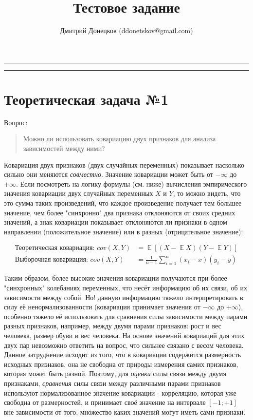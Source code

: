 \documentclass[a4paper,12pt]{article}
\title{\vspace{-1.5cm}Тестовое задание}
\author{Дмитрий Донецков (ddonetskov@gmail.com)}
\date{\vspace{-5ex}}            %
\DeclareMathOperator*{\E}{\mathbb{E}}   %
\begin{document}
\maketitle

\noindent\rule{\textwidth}{2pt}
\tableofcontents
\noindent\rule{\textwidth}{2pt}

\section{Теоретическая задача №1}

Вопрос:

\begin{quote}
Можно ли использовать ковариацию двух признаков для анализа зависимостей между ними?
\end{quote}

Ковариация двух признаков (двух случайных переменных) показывает насколько сильно они меняются \textit{совместно}. Значение ковариации может быть от $-\infty$ до $+\infty$. Если посмотреть на логику формулы (см. ниже) вычисления эмпирического значения ковариации двух случайных переменных $X$ и $Y$, то можно видеть, что это сумма таких произведений, что каждое произведение получает тем большее значение, чем более "синхронно" два признака отклоняются от своих средних значений, а знак ковариации показывает отклоняются ли признаки в одном направлении (положительное значение) или в разных (отрицательное значение):

\begin{align}
\text{Теоретическая ковариация:   } cov(X, Y) &= \E[(X-\E X)(Y-\E Y)] \\
\text{Выборочная ковариация:   } cov(X, Y) &= \frac{1}{n-1} \sum_{i=1}^{n} (x_i - \bar{x})(y_i - \bar{y})
\end{align}

Таким образом, более высокие значения ковариации получаются при более "синхронных" колебаниях переменных, что несёт информацию об их связи, об их зависимости между собой. Но! данную информацию тяжело интерпретировать в силу её ненормализованности (ковариация принимает значения от $-\infty$ до $+\infty$), особенно тяжело её использовать для сравнения силы зависимости между парами разных признаков, например, между двумя парами признаков: рост и вес человека, размер обуви и вес человека. На основе значений ковариаций для этих двух пар невозможно ответить на вопрос, что сильнее связано с весом человека. Данное затруднение исходит из того, что в ковариации содержится размерность исходных признаков, она не свободна от природы измерения самих признаков, которая может быть разной. Поэтому, для \textit{оценки} силы связи между двумя признаками, \textit{сравнения} силы связи между различными парами признаков используют нормализованное значение ковариации - корреляцию, которая уже свободна от размерностей, и принимает своё значение на интервале $[-1; +1]$ вне зависимости от того, множество каких значений могут иметь сами признаки.
\end{document}
